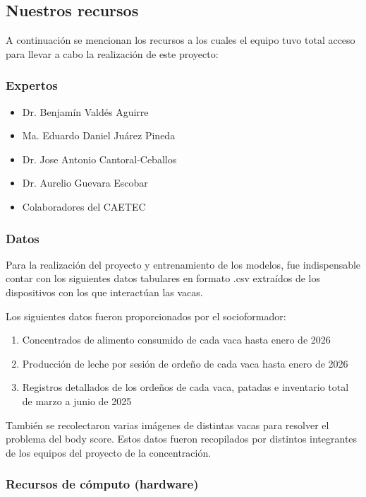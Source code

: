 \subsection{Nuestros recursos}

A continuación se mencionan los recursos a los cuales el equipo tuvo total acceso para llevar a cabo la realización de este proyecto:

\subsubsection{Expertos}

\begin{itemize}
  \item Dr. Benjamín Valdés Aguirre
  \item Ma. Eduardo Daniel Juárez Pineda
  \item Dr. Jose Antonio Cantoral-Ceballos
  \item Dr. Aurelio Guevara Escobar
  \item Colaboradores del CAETEC
\end{itemize}

\subsubsection{Datos}

Para la realización del proyecto y entrenamiento de los modelos, fue indispensable contar con los siguientes datos tabulares en formato .csv extraídos de los dispositivos con los que interactúan las vacas.

Los siguientes datos fueron proporcionados por el socioformador:

\begin{enumerate}
  \item Concentrados de alimento consumido de cada vaca hasta enero de 2026
  \item Producción de leche por sesión de ordeño de cada vaca hasta enero de 2026
  \item Registros detallados de los ordeños de cada vaca, patadas e inventario total de marzo a junio de 2025
\end{enumerate}

También se recolectaron varias imágenes de distintas vacas para resolver el problema del body score. Estos datos fueron recopilados por distintos integrantes de los equipos del proyecto de la concentración.

\subsubsection{Recursos de cómputo (hardware)}

